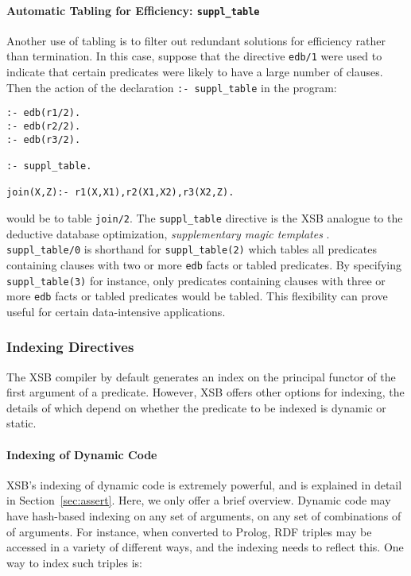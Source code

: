 \paragraph{Automatic Tabling for Efficiency: {\tt suppl\_table}}
Another use of tabling is to filter out redundant solutions for
efficiency rather than termination.  In this case, suppose that the
directive {\tt edb/1} were used to indicate that certain predicates were
likely to have a large number of clauses.  Then the action of the declaration
{\tt :- suppl\_table} in the program:
\begin{verbatim}
:- edb(r1/2).
:- edb(r2/2).
:- edb(r3/2).

:- suppl_table.

join(X,Z):- r1(X,X1),r2(X1,X2),r3(X2,Z).
\end{verbatim}
would be to table {\tt join/2}.  The {\tt suppl\_table} directive is
the XSB analogue to the deductive database optimization, {\em
supplementary magic templates} \cite{BeRa91}.  {\tt suppl\_table/0} is
shorthand for {\tt suppl\_table(2)} which tables all predicates
containing clauses with two or more {\tt edb} facts or tabled
predicates.  By specifying {\tt suppl\_table(3)} for instance, only
predicates containing clauses with three or more {\tt edb} facts or
tabled predicates would be tabled.  This flexibility can prove useful
for certain data-intensive applications.


\subsubsection{Indexing Directives}\label{indexing_directives}

The XSB compiler by default generates an index on the principal
functor of the first argument of a predicate.  However, XSB offers
other options for indexing, the details of which depend on whether the
predicate to be indexed is dynamic or static. 

\paragraph{Indexing of Dynamic Code}
XSB's indexing of dynamic code is extremely powerful, and is explained
in detail in Section~\ref{sec:assert}.  Here, we only offer a brief
overview.  Dynamic code may have hash-based indexing on any set of
arguments, on any set of combinations of of arguments.  For instance,
when converted to Prolog, RDF triples may be accessed in a variety of
different ways, and the indexing needs to reflect this.  One way to
index such triples is:

